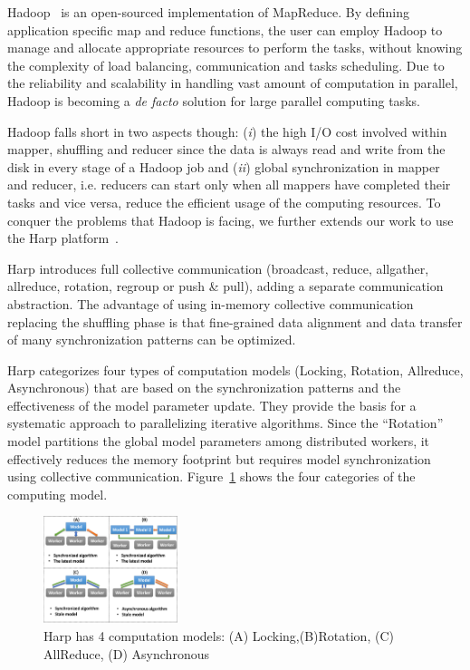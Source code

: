Hadoop~\cite{white2010hadoop} is an open-sourced implementation of
MapReduce.  By defining application specific map and reduce functions,
the user can employ Hadoop to manage and allocate appropriate
resources to perform the tasks, without knowing the complexity of load
balancing, communication and tasks scheduling. Due to the reliability
and scalability in handling vast amount of computation in parallel,
Hadoop is becoming a \emph{de facto} solution for large parallel
computing tasks.

Hadoop falls short in two aspects though: ({\it i}) the high I/O cost
involved within mapper, shuffling and reducer since the data is always
read and write from the disk in every stage of a Hadoop job and ({\it ii})
global synchronization in mapper and reducer, i.e. reducers can start
only when all mappers have completed their tasks and vice versa,
reduce the efficient usage of the computing resources. To conquer the
problems that Hadoop is facing, we further extends our work to use the
Harp platform~\cite{qiu2014towards}.

Harp introduces full collective communication (broadcast, reduce,
allgather, allreduce, rotation, regroup or push \& pull), adding a
separate communication abstraction. The advantage of using in-memory
collective communication replacing the shuffling phase is that
fine-grained data alignment and data transfer of many synchronization
patterns can be optimized.

Harp categorizes four types of computation models (Locking, Rotation,
Allreduce, Asynchronous) that are based on the synchronization
patterns and the effectiveness of the model parameter update. They
provide the basis for a systematic approach to parallelizing iterative
algorithms. Since the ``Rotation'' model partitions the global model
parameters among distributed workers, it effectively reduces the
memory footprint but requires model synchronization using collective
communication. Figure~\ref{fig:harp} shows the four categories of the
computing model.

\begin{figure}[htbp]
\centerline{\includegraphics[width=0.35\textwidth]{plots/harp.eps}}

\caption{Harp has 4 computation models: (A) Locking,(B)Rotation, (C) AllReduce, (D) Asynchronous}

\label{fig:harp}
\end{figure}

